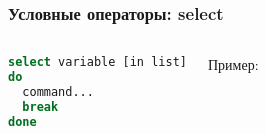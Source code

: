 \begin{frame}[fragile]
\frametitle{Условные операторы: select}

	\small
	\begin{columns}

		\begin{lstlisting}[language=sh,frame=single]
select variable [in list]
do
  command...
  break
done 
		\end{lstlisting}
		\pause
		{\normalsize Пример:}

         
		\pause

	\end{columns}
\end{frame}
